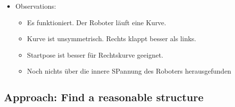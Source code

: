 \documentclass[10pt,a4paper]{article}
\begin{document}
\begin{itemize}
\item Observations:

\begin{itemize}
	\item Es funktioniert. Der Roboter läuft eine Kurve.
	\item Kurve ist unsymmetrisch. Rechts klappt besser als links.
	\item Startpose ist besser für Rechtskurve geeignet.
	\item Noch nichts über die innere SPannung des Roboters herausgefunden
\end{itemize}



\end{itemize}


\subsection{Approach: Find a reasonable structure}
\end{document}
